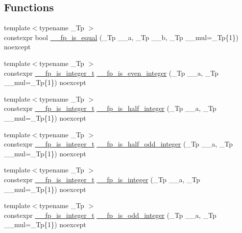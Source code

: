 \subsection*{Functions}
\begin{DoxyCompactItemize}
\item 
{\footnotesize template$<$typename \+\_\+\+Tp $>$ }\\constexpr bool \hyperlink{namespace____gnu__cxx_af8b87759dc0b043b46f9e7f0dec88a79}{\+\_\+\+\_\+fp\+\_\+is\+\_\+equal} (\+\_\+\+Tp \+\_\+\+\_\+a, \+\_\+\+Tp \+\_\+\+\_\+b, \+\_\+\+Tp \+\_\+\+\_\+mul=\+\_\+\+Tp\{1\}) noexcept
\item 
{\footnotesize template$<$typename \+\_\+\+Tp $>$ }\\constexpr \hyperlink{struct____gnu__cxx_1_1____fp__is__integer__t}{\+\_\+\+\_\+fp\+\_\+is\+\_\+integer\+\_\+t} \hyperlink{namespace____gnu__cxx_ab12d5d801c39cd185e31bf2ed6ce94ff}{\+\_\+\+\_\+fp\+\_\+is\+\_\+even\+\_\+integer} (\+\_\+\+Tp \+\_\+\+\_\+a, \+\_\+\+Tp \+\_\+\+\_\+mul=\+\_\+\+Tp\{1\}) noexcept
\item 
{\footnotesize template$<$typename \+\_\+\+Tp $>$ }\\constexpr \hyperlink{struct____gnu__cxx_1_1____fp__is__integer__t}{\+\_\+\+\_\+fp\+\_\+is\+\_\+integer\+\_\+t} \hyperlink{namespace____gnu__cxx_a1f53ff9c9325c6bd9f4ababf5f7e62e4}{\+\_\+\+\_\+fp\+\_\+is\+\_\+half\+\_\+integer} (\+\_\+\+Tp \+\_\+\+\_\+a, \+\_\+\+Tp \+\_\+\+\_\+mul=\+\_\+\+Tp\{1\}) noexcept
\item 
{\footnotesize template$<$typename \+\_\+\+Tp $>$ }\\constexpr \hyperlink{struct____gnu__cxx_1_1____fp__is__integer__t}{\+\_\+\+\_\+fp\+\_\+is\+\_\+integer\+\_\+t} \hyperlink{namespace____gnu__cxx_a6d99c5dcab15b6837c2a60f2b367ed2c}{\+\_\+\+\_\+fp\+\_\+is\+\_\+half\+\_\+odd\+\_\+integer} (\+\_\+\+Tp \+\_\+\+\_\+a, \+\_\+\+Tp \+\_\+\+\_\+mul=\+\_\+\+Tp\{1\}) noexcept
\item 
{\footnotesize template$<$typename \+\_\+\+Tp $>$ }\\constexpr \hyperlink{struct____gnu__cxx_1_1____fp__is__integer__t}{\+\_\+\+\_\+fp\+\_\+is\+\_\+integer\+\_\+t} \hyperlink{namespace____gnu__cxx_ab425c7f3a50b494efaa2e6bdb6e55f08}{\+\_\+\+\_\+fp\+\_\+is\+\_\+integer} (\+\_\+\+Tp \+\_\+\+\_\+a, \+\_\+\+Tp \+\_\+\+\_\+mul=\+\_\+\+Tp\{1\}) noexcept
\item 
{\footnotesize template$<$typename \+\_\+\+Tp $>$ }\\constexpr \hyperlink{struct____gnu__cxx_1_1____fp__is__integer__t}{\+\_\+\+\_\+fp\+\_\+is\+\_\+integer\+\_\+t} \hyperlink{namespace____gnu__cxx_a09bf2941743c58db8b086da401473c16}{\+\_\+\+\_\+fp\+\_\+is\+\_\+odd\+\_\+integer} (\+\_\+\+Tp \+\_\+\+\_\+a, \+\_\+\+Tp \+\_\+\+\_\+mul=\+\_\+\+Tp\{1\}) noexcept

\end{DoxyCompactItemize}
